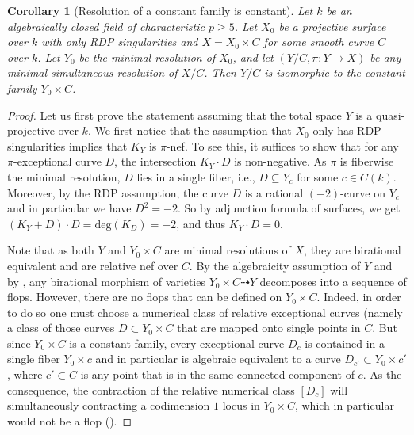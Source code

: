 \documentclass[11pt, letterpaper]{amsart}
\theoremstyle{plain}
\newtheorem{corollary}[theorem]{Corollary}
\theoremstyle{definition}
\renewcommand{\deg}{\mathrm{deg}}
\newcommand{\<}{\langle}
\renewcommand{\>}{\rangle}
\begin{document}
\begin{corollary}[Resolution of a constant family is constant]
	\label{cor: res of constant family}
	Let $k$ be an algebraically closed field of characteristic $p \ge 5$. 
	Let $X_0$ be a projective surface over $k$ with only RDP singularities and $X = X_0 \times C$ for some smooth curve $C$ over $k$. 
	Let $Y_0$ be the minimal resolution of $X_0$, and let $(Y/C, \pi : Y \to X)$ be any minimal simultaneous resolution of $X/C$. 
	Then $Y/C$ is isomorphic to the constant family $Y_0 \times C$.
\end{corollary}
\begin{proof}
    Let us first prove the statement assuming that the total space $Y$ is a quasi-projective over $k$. 
	We first notice that the assumption that $X_0$ only has RDP singularities implies that $K_Y$ is $\pi$-nef. 
	To see this, it suffices to show that for any $\pi$-exceptional curve $D$, the intersection $K_Y\cdot D$ is non-negative. 
	As $\pi$ is fiberwise the minimal resolution, $D$ lies in a single fiber, i.e., $D \subseteq Y_c$ for some $c \in C(k)$. 
	Moreover, by the RDP assumption, the curve $D$ is a rational $(-2)$-curve on $Y_c$ and in particular we have $D^2=-2$.  
	So by adjunction formula of surfaces, we get $(K_Y+D)\cdot D=\deg (K_D) = -2$, and thus $K_Y\cdot D=0$.
	
	Note that as both $Y$ and $Y_0 \times C$ are minimal resolutions of $X$, they are birational equivalent and are relative nef over $C$. 
	By the algebraicity assumption of $Y$ and by , any birational morphism of varieties $Y_0 \times C \dashrightarrow Y$ decomposes into a sequence of flops. 
	However, there are no flops that can be defined on $Y_0 \times C$. 
	Indeed, in order to do so one must choose a numerical class of relative exceptional curves (namely a class of those curves $D\subset Y_0\times C$ that are mapped onto single points in $C$. 
	But since $Y_0 \times C$ is a constant family, every exceptional curve $D_c$ is contained in a single fiber $Y_0\times c$ and in particular is algebraic equivalent to a curve $D_{c'}\subset Y_0\times c'$, where $c'\subset C$ is any point that is in the same connected component of $c$.
	As the consequence, the contraction of the relative numerical class $[D_c]$ will simultaneously contracting a codimension $1$ locus in $Y_0\times C$, which in particular would not be a flop (\cite[Def.6.10]{KM98}).


\end{proof}
\end{document}

